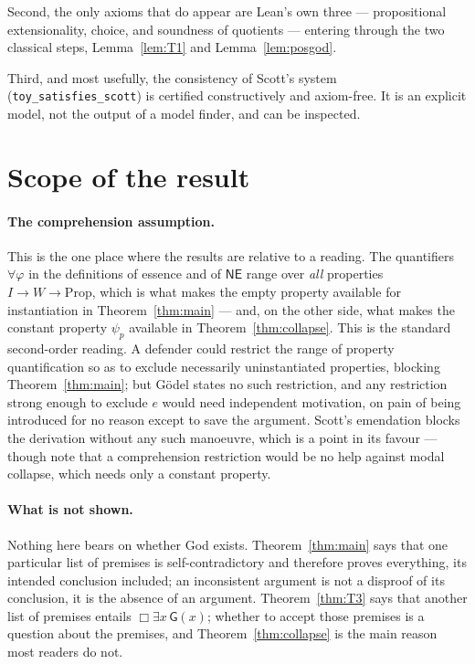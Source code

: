\documentclass[11pt]{article}
\theoremstyle{plain}
\theoremstyle{definition}
\newcommand{\Prp}{\mathrm{Prop}}
\newcommand{\NE}{\mathsf{NE}}
\newcommand{\Gd}{\mathsf{G}}
\begin{document}
Second, the only axioms that do appear are Lean's own three --- propositional
extensionality, choice, and soundness of quotients --- entering through the two
classical steps, Lemma~\ref{lem:T1} and Lemma~\ref{lem:posgod}.

Third, and most usefully, the consistency of Scott's system
(\verb|toy_satisfies_scott|) is certified constructively and axiom-free. It is
an explicit model, not the output of a model finder, and can be inspected.

\section{Scope of the result}\label{sec:caveats}

\paragraph{The comprehension assumption.}
This is the one place where the results are relative to a reading. The
quantifiers $\forall\varphi$ in the definitions of essence and of $\NE$ range
over \emph{all} properties $I \to W \to \Prp$, which is what makes the empty
property available for instantiation in Theorem~\ref{thm:main} --- and, on the
other side, what makes the constant property $\psi_p$ available in
Theorem~\ref{thm:collapse}. This is the standard second-order reading. A
defender could restrict the range of property quantification so as to exclude
necessarily uninstantiated properties, blocking Theorem~\ref{thm:main}; but
G\"odel states no such restriction, and any restriction strong enough to
exclude $e$ would need independent motivation, on pain of being introduced for
no reason except to save the argument. Scott's emendation blocks the derivation
without any such manoeuvre, which is a point in its favour --- though note that
a comprehension restriction would be no help against modal collapse, which
needs only a constant property.

\paragraph{What is not shown.}
Nothing here bears on whether God exists. Theorem~\ref{thm:main} says that one
particular list of premises is self-contradictory and therefore proves
everything, its intended conclusion included; an inconsistent argument is not a
disproof of its conclusion, it is the absence of an argument.
Theorem~\ref{thm:T3} says that another list of premises entails
$\Box\exists x\,\Gd(x)$; whether to accept those premises is a question about
the premises, and Theorem~\ref{thm:collapse} is the main reason most readers do
not.
\end{document}
